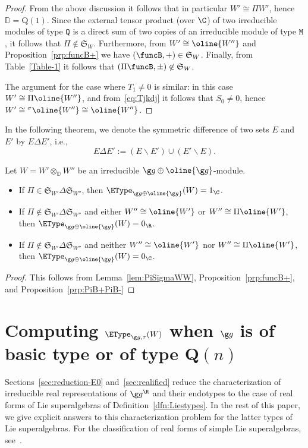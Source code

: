 \documentclass[12pt]{amsart}
\begin{document}
\begin{proof}
From the above discussion it follows that in particular $W'\cong \Pi W'$, hence  $\mathbb D=\mathrm{Q}(1)$. Since the external tensor product (over $\C$) of two irreducible modules of type $\mathtt Q$ is a direct sum of two copies of an irreducible module of type $\mathtt M$, it follows that $\Pi\not\in\mathfrak S_W$. Furthermore, from $W'\cong \oline{W''}$ and Proposition~\ref{prp:funcB+}  we have $(\funcB,+)\in\mathfrak S_W$.  Finally, from  Table~\ref{Table-1} it follows that $(\Pi\funcB,\pm )\not\in\mathfrak S_W$. 

The argument for the case where  $T_1\neq 0$ is similar: in this case $W'\cong\Pi\oline{W''}$, and 
from~\eqref{eq:Tjkdj} it follows that $S_0\neq 0$, hence $W'\cong {^\sigma\oline{W''}}\cong \oline{W''}$.
\end{proof}
In the following theorem, we denote the symmetric difference of two sets $E$ and $E'$ by $E\Delta E'$, i.e., \[
E\Delta E':=(E\backslash E')\cup (E'\backslash E).
\] 
\begin{thm}
\label{thm:W'W''D}Let
$W=W'\otimes_\mathbb D W''$
be an irreducible  $\g g\oplus\oline{\g g}$-module.
\begin{itemize}
\item[\rm (i)] If $\Pi\in\mathfrak S_{W'}\Delta \mathfrak S_{W''}$, then $\EType_{\g g\oplus\oline{\g g}}(W)=1_\C$.
\item[\rm (ii)] If $\Pi\not\in \mathfrak S_{W'}\Delta \mathfrak S_{W''}$ and either $W''\cong\oline{W'}$ or $W''\cong \Pi\oline{W'}$, then $\EType_{\g g\oplus\oline{\g g}}(W)=0_\R$.
\item[\rm (iii)] If $\Pi\not\in \mathfrak S_{W'}\Delta \mathfrak S_{W''}$ and neither $W''\cong\oline{W'}$ nor $W''\cong \Pi\oline{W'}$, then $\EType_{\g g\oplus\oline{\g g}}(W)=0_\C$.

\end{itemize}
\end{thm}
\begin{proof}
This follows from Lemma~\ref{lem:PiSigmaWW}, Proposition~\ref{prp:funcB+}, and Proposition~\ref{prp:PiB+PiB-}
\end{proof}

\section{Computing $\EType_{\g g,\tau}(W)$ when $\g g$ is of basic type or of type $\mathbf Q(n)$}
\label{sec:ETypeWbasic-Q}

Sections~\ref{sec:reduction-E0} and~\ref{sec:realified} reduce the characterization of irreducible real representations of $\g g^\R$ and their endotypes to the case of real forms of Lie superalgebras of Definition~\ref{dfn:Liestypes}. In the rest of this paper, we give explicit answers to this characterization problem for the latter types of Lie superalgebras. For the classification of real forms of simple Lie superalgebras, see~\cite{Serganova,Parker}.  
\end{document}
